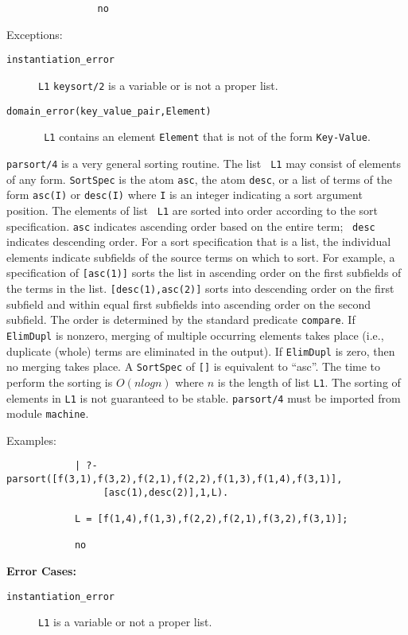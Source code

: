 \begin{description}
{\begin{verbatim}
                no \end{verbatim}}
     Exceptions: 
\begin{description} 
\item[{\tt instantiation\_error}]
     {\tt L1} {\tt keysort/2} is a variable or is not a proper
     list.  
\item[{\tt domain\_error(key\_value\_pair,Element)}] {\tt
     L1} contains an element {\tt Element} that is not of the
     form \verb'Key-Value'.  
\end{description}

%
    {\tt parsort/4} is a very general sorting routine.  The list {\tt
    L1} may consist of elements of any form.  {\tt SortSpec} is the
    atom {\tt asc}, the atom {\tt desc}, or a list of terms of the
    form {\tt asc(I)} or {\tt desc(I)} where {\tt I} is an integer
    indicating a sort argument position.  The elements of list {\tt
    L1} are sorted into order according to the sort specification.
    {\tt asc} indicates ascending order based on the entire term; {\tt
    desc} indicates descending order.  For a sort specification that
    is a list, the individual elements indicate subfields of the
    source terms on which to sort.  For example, a specification of
    {\tt [asc(1)]} sorts the list in ascending order on the first
    subfields of the terms in the list.  {\tt [desc(1),asc(2)]} sorts
    into descending order on the first subfield and within equal first
    subfields into ascending order on the second subfield.  The order
    is determined by the standard predicate {\tt compare}.  If {\tt
    ElimDupl} is nonzero, merging of multiple occurring elements takes
    place (i.e., duplicate (whole) terms are eliminated in the
    output).  If {\tt ElimDupl} is zero, then no merging takes place.
    A {\tt SortSpec} of {\tt []} is equivalent to ``asc''.  The time
    to perform the sorting is $O(n log n)$ where $n$ is the length of
    list {\tt L1}.  The sorting of elements in {\tt L1} is not
    guaranteed to be stable. {\tt parsort/4} must be imported from
    module {\tt machine}.

    Examples:
    {\footnotesize
     \begin{verbatim}
            | ?- parsort([f(3,1),f(3,2),f(2,1),f(2,2),f(1,3),f(1,4),f(3,1)],
                 [asc(1),desc(2)],1,L). 

            L = [f(1,4),f(1,3),f(2,2),f(2,1),f(3,2),f(3,1)];

            no \end{verbatim}}

{\bf Error Cases:}
\begin{description} 
\item[{\tt instantiation\_error}]
     {\tt L1} is a variable or not a proper list.  
\end{description}
\end{description}

